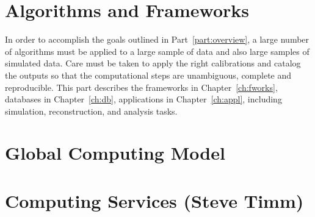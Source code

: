 \documentclass{dune} %
\begin{document}
\part{Algorithms and Frameworks} %

In order to accomplish the goals outlined in Part~\ref{part:overview}, a large number of algorithms must be applied to a large sample of data and also large samples of simulated data.  Care must be taken to apply the right calibrations and catalog the outputs so that the computational steps are unambiguous, complete and reproducible.  This part describes the frameworks in Chapter~\ref{ch:fworks}, databases in Chapter~\ref{ch:db}, applications in Chapter~\ref{ch:appl}, including simulation, reconstruction, and analysis tasks.

\cleardoublepage

\cleardoublepage


\cleardoublepage

\part{Global Computing Model  } %


\cleardoublepage


\cleardoublepage


\cleardoublepage


\cleardoublepage


\cleardoublepage

\part{Computing Services (Steve Timm)} %


\cleardoublepage


\cleardoublepage


\cleardoublepage


\cleardoublepage


\cleardoublepage
\end{document}
